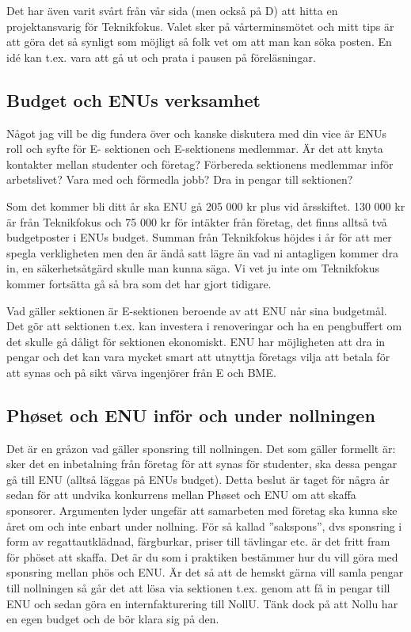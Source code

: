 \documentclass[10pt]{article}
\begin{document}
Det har även varit svårt från vår sida (men också på D) att hitta en projektansvarig för Teknikfokus. Valet sker på vårterminsmötet och mitt tips är att göra det så synligt som möjligt så folk vet om att man kan söka posten. En idé kan t.ex. vara att gå ut och prata i pausen på föreläsningar.

\subsection*{Budget och ENUs verksamhet}
Något jag vill be dig fundera över och kanske diskutera med din vice är ENUs roll och syfte för E-
sektionen och E-sektionens medlemmar. Är det att knyta kontakter mellan studenter och företag? Förbereda sektionens medlemmar inför arbetslivet? Vara med och förmedla jobb? Dra in pengar till
sektionen?

Som det kommer bli ditt år ska ENU gå 205 000 kr plus vid årsskiftet. 130 000 kr är från Teknikfokus och 75 000 kr för intäkter från företag, det finns alltså två budgetposter i ENUs budget. Summan från Teknikfokus höjdes i år för att mer spegla verkligheten men den är ändå satt lägre än vad ni antagligen kommer dra in, en säkerhetsåtgärd skulle man kunna säga. Vi vet ju inte om Teknikfokus kommer fortsätta gå så bra som det har gjort tidigare.

Vad gäller sektionen är E-sektionen beroende av att ENU når sina budgetmål. Det gör att sektionen
t.ex. kan investera i renoveringar och ha en pengbuffert om det skulle gå dåligt för sektionen ekonomiskt. ENU har möjligheten att dra in pengar och det kan vara mycket smart att utnyttja
företags vilja att betala för att synas och på sikt värva ingenjörer från E och BME.

\subsection*{Ph\o set och ENU inför och under nollningen}
Det är en gråzon vad gäller sponsring till nollningen. Det som gäller formellt är: sker det en inbetalning från företag för att synas för studenter, ska dessa pengar gå till ENU (alltså läggas på ENUs budget). Detta beslut är taget för några år sedan för att undvika konkurrens mellan Ph\o set och ENU om att skaffa sponsorer. Argumenten lyder ungefär att samarbeten med företag ska kunna ske året om och inte enbart under nollning. För så kallad ”sakspons”, dvs sponsring i form av regattautklädnad, färgburkar, priser till tävlingar etc. är det fritt fram för phöset att skaffa. Det är du som i praktiken bestämmer hur du vill göra med sponsring mellan phös och ENU. Är det så att de hemskt gärna vill samla pengar till nollningen så går det att lösa via sektionen t.ex. genom att få in pengar till ENU och sedan göra en internfakturering till NollU. Tänk dock på att Nollu har en egen budget och de bör klara sig på den.
\end{document}
